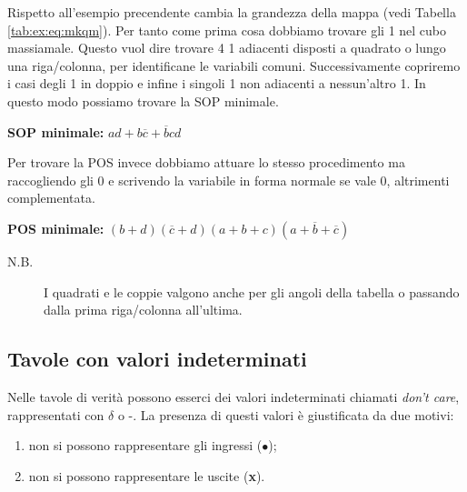 \begin{example}
Rispetto all'esempio precendente cambia la grandezza della mappa (vedi Tabella \ref{tab:ex:eq:mkqm}). Per tanto come prima cosa dobbiamo trovare gli 1 nel cubo massiamale. Questo vuol dire trovare 4 1 adiacenti disposti a quadrato o lungo una riga/colonna, per identificane le variabili comuni. Successivamente copriremo i casi degli 1 in doppio e infine i singoli 1 non adiacenti a nessun'altro 1.
In questo modo possiamo trovare la SOP minimale.

\textbf{SOP minimale:} $ad+b\overline{c}+\overline{b}cd$

Per trovare la POS invece dobbiamo attuare lo stesso procedimento ma raccogliendo gli 0 e scrivendo la variabile in forma normale se vale 0, altrimenti complementata.

\textbf{POS minimale:} $(b+d)(\overline{c}+d)(a+b+c)(a+\overline{b}+\overline{c})$

\begin{description}
    \item[N.B.] I quadrati e le coppie valgono anche per gli angoli della tabella o passando dalla prima riga/colonna all'ultima.
\end{description}
\end{example}


\subsection*{Tavole con valori indeterminati}
Nelle tavole di verità possono esserci dei valori indeterminati chiamati \textit{don't care}, rappresentati con $\delta$ o -.
La presenza di questi valori è giustificata da due motivi:
\begin{enumerate}
    \item non si possono rappresentare gli ingressi ($\bullet$);
    \item non si possono rappresentare le uscite (\textbf{x}).
\end{enumerate}

